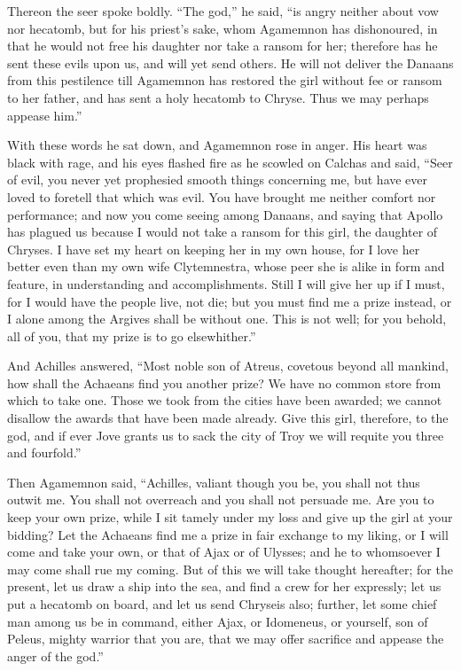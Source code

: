 Thereon the seer spoke boldly. “The god,” he said, “is angry neither about
vow nor hecatomb, but for his priest’s sake, whom Agamemnon has
dishonoured, in that he would not free his daughter nor take a ransom for
her; therefore has he sent these evils upon us, and will yet send others.
He will not deliver the Danaans from this pestilence till Agamemnon has
restored the girl without fee or ransom to her father, and has sent a holy
hecatomb to Chryse. Thus we may perhaps appease him.”

With these words he sat down, and Agamemnon rose in anger. His heart was
black with rage, and his eyes flashed fire as he scowled on Calchas and
said, “Seer of evil, you never yet prophesied smooth things concerning me,
but have ever loved to foretell that which was evil. You have brought me
neither comfort nor performance; and now you come seeing among Danaans,
and saying that Apollo has plagued us because I would not take a ransom
for this girl, the daughter of Chryses. I have set my heart on keeping her
in my own house, for I love her better even than my own wife Clytemnestra,
whose peer she is alike in form and feature, in understanding and
accomplishments. Still I will give her up if I must, for I would have the
people live, not die; but you must find me a prize instead, or I alone
among the Argives shall be without one. This is not well; for you behold,
all of you, that my prize is to go elsewhither.”

And Achilles answered, “Most noble son of Atreus, covetous beyond all
mankind, how shall the Achaeans find you another prize? We have no common
store from which to take one. Those we took from the cities have been
awarded; we cannot disallow the awards that have been made already. Give
this girl, therefore, to the god, and if ever Jove grants us to sack the
city of Troy we will requite you three and fourfold.”

Then Agamemnon said, “Achilles, valiant though you be, you shall not thus
outwit me. You shall not overreach and you shall not persuade me. Are you
to keep your own prize, while I sit tamely under my loss and give up the
girl at your bidding? Let the Achaeans find me a prize in fair exchange to
my liking, or I will come and take your own, or that of Ajax or of
Ulysses; and he to whomsoever I may come shall rue my coming. But of this
we will take thought hereafter; for the present, let us draw a ship into
the sea, and find a crew for her expressly; let us put a hecatomb on
board, and let us send Chryseis also; further, let some chief man among us
be in command, either Ajax, or Idomeneus, or yourself, son of Peleus,
mighty warrior that you are, that we may offer sacrifice and appease the
anger of the god.”

